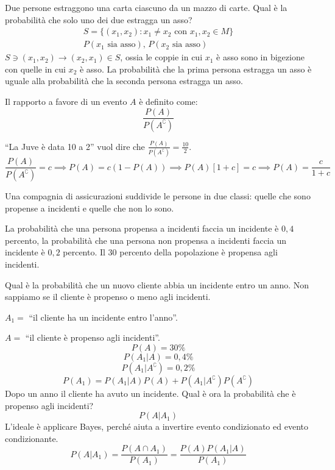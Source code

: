 \begin{exmp}
Due persone estraggono una carta ciascuno da un mazzo di carte. Qual \`e la probabilit\`a che solo uno dei due estragga un asso?
\begin{gather*}
S = \{ (x_1, x_2) : x_1 \neq x_2 \text{ con } x_1, x_2 \in M \} \\
P(x_1 \text{ sia asso}), \, P(x_2 \text{ sia asso})
\end{gather*}
$S \ni (x_1, x_2) \to (x_2, x_1) \in S$, ossia le coppie in cui $x_1$ \`e asso sono in bigezione con quelle in cui $x_2$ \`e asso. La probabilit\`a che la prima persona estragga un asso \`e uguale alla probabilit\`a che la seconda persona estragga un asso.
\end{exmp}

\begin{defn}
Il rapporto a favore di un evento $A$ \`e definito come:
\[
\frac{P(A)}{P(A^{\complement})}
\]
\end{defn}
\begin{exmp}
``La Juve \`e data 10 a 2'' vuol dire che $\frac{P(A)}{P(A^{\complement})} = \frac{10}{2}$.
\[
\frac{P(A)}{P(A^{\complement})} = c \implies P(A) = c (1 - P(A)) \implies P(A) [1 + c] = c \implies P(A) = \frac{c}{1 + c}
\]
\end{exmp}

\begin{exmp}
Una compagnia di assicurazioni suddivide le persone in due classi: quelle che sono propense a incidenti e quelle che non lo sono.

La probabilit\`a che una persona propensa a incidenti faccia un incidente \`e $0{,}4$ percento, la probabilit\`a che una persona non propensa a incidenti faccia un incidente \`e $0{,}2$ percento. Il 30 percento della popolazione \`e propensa agli incidenti.

Qual \`e la probabilit\`a che un nuovo cliente abbia un incidente entro un anno. Non sappiamo se il cliente \`e propenso o meno agli incidenti.

$A_1 = $ ``il cliente ha un incidente entro l'anno''.

$A = $ ``il cliente \`e propenso agli incidenti''.
\[
P(A) = 30 \%
\]
\[
P(A_1 | A) = 0{,}4 \%
\]
\[
P(A_1 | A^{\complement}) = 0{,}2 \%
\]
\[
P(A_1) = P(A_1 | A) P(A) + P(A_1 | A^{\complement}) P(A^{\complement})
\]
Dopo un anno il cliente ha avuto un incidente. Qual \`e ora la probabilit\`a che \`e propenso agli incidenti?
\[
P(A | A_1)
\]
L'ideale \`e applicare Bayes, perch\'e aiuta a invertire evento condizionato ed evento condizionante.
\[
P(A | A_1) = \frac{P(A \cap A_1)}{P(A_1)} = \frac{P(A) P(A_1 | A)}{P(A_1)}
\]
\end{exmp}

